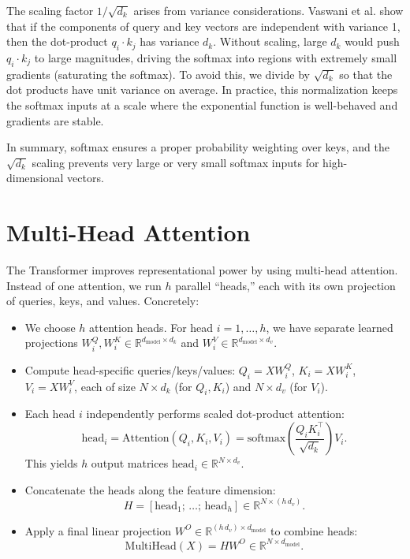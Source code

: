 \documentclass[11pt,a4paper]{article}
\begin{document}
The scaling factor $1/\sqrt{d_k}$ arises from variance considerations. Vaswani et al. show that if the components of query and key vectors are independent with variance 1, then the dot-product $q_i\cdot k_j$ has variance $d_k$. Without scaling, large $d_k$ would push $q_i\cdot k_j$ to large magnitudes, driving the softmax into regions with extremely small gradients (saturating the softmax). To avoid this, we divide by $\sqrt{d_k}$ so that the dot products have unit variance on average. In practice, this normalization keeps the softmax inputs at a scale where the exponential function is well-behaved and gradients are stable.

In summary, softmax ensures a proper probability weighting over keys, and the $\sqrt{d_k}$ scaling prevents very large or very small softmax inputs for high-dimensional vectors.

\section{Multi-Head Attention}

The Transformer improves representational power by using multi-head attention. Instead of one attention, we run $h$ parallel ``heads,'' each with its own projection of queries, keys, and values. Concretely:

\begin{itemize}
\item We choose $h$ attention heads. For head $i=1,\dots,h$, we have separate learned projections $W_i^Q,W_i^K\in\mathbb{R}^{d_{\text{model}}\times d_k}$ and $W_i^V\in\mathbb{R}^{d_{\text{model}}\times d_v}$.

\item Compute head-specific queries/keys/values: $Q_i = XW_i^Q$, $K_i = XW_i^K$, $V_i = XW_i^V$, each of size $N\times d_k$ (for $Q_i,K_i$) and $N\times d_v$ (for $V_i$).

\item Each head $i$ independently performs scaled dot-product attention:
$$\text{head}_i = \text{Attention}(Q_i,K_i,V_i) = \text{softmax}\left(\frac{Q_iK_i^\top}{\sqrt{d_k}}\right)V_i.$$
This yields $h$ output matrices $\text{head}_i\in\mathbb{R}^{N\times d_v}$.

\item Concatenate the heads along the feature dimension: 
$$H = [\text{head}_1;\,\dots;\,\text{head}_h] \in\mathbb{R}^{N\times (h\,d_v)}.$$

\item Apply a final linear projection $W^O\in\mathbb{R}^{(h\,d_v)\times d_{\text{model}}}$ to combine heads:
$$\text{MultiHead}(X) = HW^O \in \mathbb{R}^{N\times d_{\text{model}}}.$$
\end{itemize}
\end{document}
